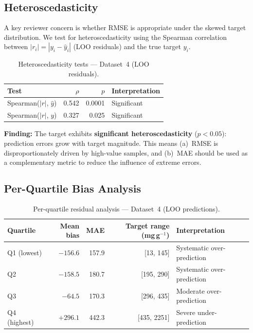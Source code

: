 \documentclass[12pt,a4paper]{article}
\begin{document}
\subsection{Heteroscedasticity}

A key reviewer concern is whether RMSE is appropriate under the skewed
target distribution.  We test for heteroscedasticity using the Spearman
correlation between $|r_i| = |y_i - \hat{y}_i|$ (LOO residuals) and the
true target $y_i$.

\begin{table}[h]
\centering
\caption{Heteroscedasticity tests — Dataset~4 (LOO residuals).}
\label{tab:ds4_hetero}
\begin{tabular}{lrrl}
\toprule
Test & $\rho$ & $p$ & Interpretation \\
\midrule
Spearman($|r|$, $\hat{y}$) & 0.542 & 0.0001 & Significant \\
Spearman($|r|$, $y$)       & 0.327 & 0.025  & Significant \\
\bottomrule
\end{tabular}
\end{table}

\noindent\textbf{Finding:}  The target exhibits \textbf{significant
heteroscedasticity} ($p < 0.05$): prediction errors grow with target
magnitude.  This means (a)~RMSE is disproportionately driven by
high-value samples, and (b)~MAE should be used as a complementary
metric to reduce the influence of extreme errors.

\subsection{Per-Quartile Bias Analysis}

\begin{table}[h]
\centering
\caption{Per-quartile residual analysis — Dataset~4 (LOO predictions).}
\label{tab:ds4_quartile_bias}
\small
\begin{tabular}{lrrrl}
\toprule
Quartile & Mean bias & MAE & Target range (mg\,g$^{-1}$) & Interpretation \\
\midrule
Q1 (lowest)  & $-156.6$ & 157.9 & [13, 145]    & Systematic over-prediction \\
Q2           & $-158.5$ & 180.7 & [195, 290]   & Systematic over-prediction \\
Q3           & $-64.5$  & 170.3 & [296, 435]   & Moderate over-prediction \\
Q4 (highest) & $+296.1$ & 442.3 & [435, 2251]  & Severe under-prediction \\
\bottomrule
\end{tabular}
\end{table}
\end{document}
